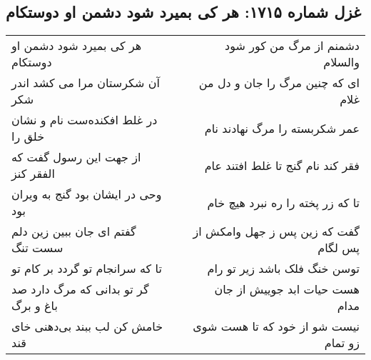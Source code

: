 \begin{center}
\section*{غزل شماره ۱۷۱۵: هر کی بمیرد شود دشمن او دوستکام}
\label{sec:1715}
\begin{longtable}{l p{0.5cm} r}
هر کی بمیرد شود دشمن او دوستکام
&&
دشمنم از مرگ من کور شود والسلام
\\
آن شکرستان مرا می کشد اندر شکر
&&
ای که چنین مرگ را جان و دل من غلام
\\
در غلط افکنده‌ست نام و نشان خلق را
&&
عمر شکربسته را مرگ نهادند نام
\\
از جهت این رسول گفت که الفقر کنز
&&
فقر کند نام گنج تا غلط افتند عام
\\
وحی در ایشان بود گنج به ویران بود
&&
تا که زر پخته را ره نبرد هیچ خام
\\
گفتم ای جان ببین زین دلم سست تنگ
&&
گفت که زین پس ز جهل وامکش از پس لگام
\\
تا که سرانجام تو گردد بر کام تو
&&
توسن خنگ فلک باشد زیر تو رام
\\
گر تو بدانی که مرگ دارد صد باغ و برگ
&&
هست حیات ابد جوییش از جان مدام
\\
خامش کن لب ببند بی‌دهنی خای قند
&&
نیست شو از خود که تا هست شوی زو تمام
\\
\end{longtable}
\end{center}
